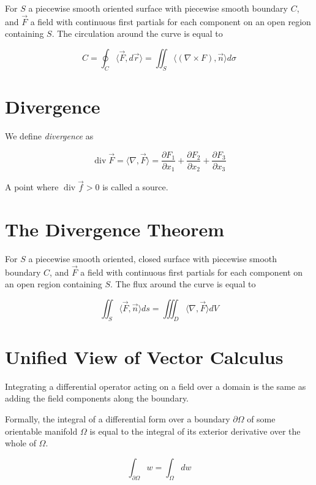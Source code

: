 For \(S\) a piecewise smooth oriented surface with piecewise smooth boundary \(C\), and \(\vec{F}\) a field with continuous 
first partials for each component on an open region containing \(S\). The circulation around the curve is equal to 

\[
    C = \oint_C \langle \vec{F}, d\vec{r} \rangle = \iint_S \langle (\nabla \times F), \vec{n} \rangle d\sigma
\]

\section{Divergence}

We define \emph{divergence} as 

\[
    \operatorname{div} \vec{F} = \langle\nabla, \vec{F}\rangle = \frac{\partial F_1}{\partial x_1} + 
    \frac{\partial F_2}{\partial x_2} + \frac{\partial F_3}{\partial x_3}
\]


A point where \( \operatorname{div}\vec{f} > 0\) is called a source.

\section{The Divergence Theorem}

For \(S\) a piecewise smooth oriented, closed surface with piecewise smooth boundary \(C\), and \(\vec{F}\) a field with continuous 
first partials for each component on an open region containing \(S\). The flux around the curve is equal to 

\[
    \iint_{S} \langle \vec{F}, \vec{n}\rangle ds = \iiint_D \langle \nabla, \vec{F} \rangle dV 
\]

\section{Unified View of Vector Calculus}

Integrating a differential operator acting on a field over a domain is the same as adding the field components along the boundary.

Formally, the integral of a differential form over a boundary \(\partial \Omega\) of some orientable manifold \(\Omega\) is equal to the integral of its exterior 
derivative over the whole of \(\Omega\).

\[
    \int_{\partial \Omega} w = \int_{\Omega} dw
\]


